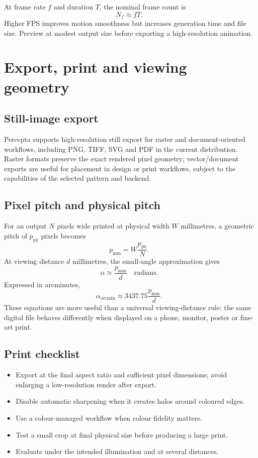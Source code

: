 \documentclass[10.5pt,a4paper]{article}
\begin{document}
At frame rate $f$ and duration $T$, the nominal frame count is
\begin{equation}
N_f\approx fT.
\end{equation}
Higher FPS improves motion smoothness but increases generation time and file size. Preview at modest output size before exporting a high-resolution animation.

\section{Export, print and viewing geometry}
\subsection{Still-image export}
Percepta supports high-resolution still export for raster and document-oriented workflows, including PNG, TIFF, SVG and PDF in the current distribution. Raster formats preserve the exact rendered pixel geometry; vector/document exports are useful for placement in design or print workflows, subject to the capabilities of the selected pattern and backend.

\subsection{Pixel pitch and physical pitch}
For an output $N$ pixels wide printed at physical width $W$ millimetres, a geometric pitch of $p_{\mathrm{px}}$ pixels becomes
\begin{equation}
p_{\mathrm{mm}}=W\frac{p_{\mathrm{px}}}{N}.
\end{equation}
At viewing distance $d$ millimetres, the small-angle approximation gives
\begin{equation}
\alpha\approx\frac{p_{\mathrm{mm}}}{d}\quad\text{radians}.
\end{equation}
Expressed in arcminutes,
\begin{equation}
\alpha_{\mathrm{arcmin}}\approx3437.75\frac{p_{\mathrm{mm}}}{d}.
\end{equation}
These equations are more useful than a universal viewing-distance rule: the same digital file behaves differently when displayed on a phone, monitor, poster or fine-art print.

\subsection{Print checklist}
\begin{itemize}
\item Export at the final aspect ratio and sufficient pixel dimensions; avoid enlarging a low-resolution render after export.
\item Disable automatic sharpening when it creates halos around coloured edges.
\item Use a colour-managed workflow when colour fidelity matters.
\item Test a small crop at final physical size before producing a large print.
\item Evaluate under the intended illumination and at several distances.
\end{itemize}
\end{document}
